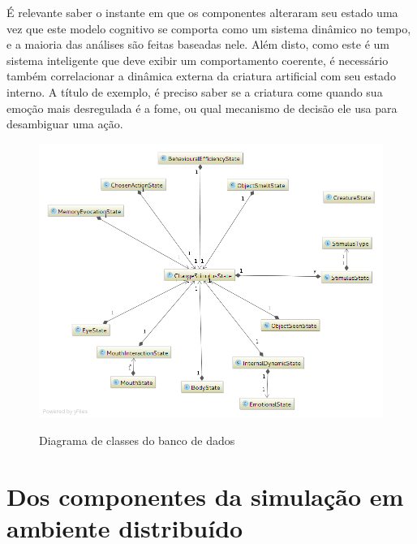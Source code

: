 É relevante  saber o instante em que os componentes alteraram seu estado uma vez que este modelo cognitivo se comporta como um sistema dinâmico no tempo, e a maioria das análises são feitas baseadas nele. Além disto, como este é um sistema inteligente que deve exibir um comportamento coerente, é necessário também correlacionar a dinâmica externa da criatura artificial com seu estado interno. A título de exemplo, é preciso saber se a criatura come quando sua emoção mais desregulada é a fome, ou qual mecanismo de decisão ele usa para desambiguar uma ação.  

\begin{figure}
    \centering
    \caption{Diagrama de classes do banco de dados}
    \includegraphics[scale=0.55]{04-figuras/bd.png}
    \label{fig:bd}
\end{figure}

\section{Dos componentes da simulação em ambiente distribuído}
\label{sec:cluster}

